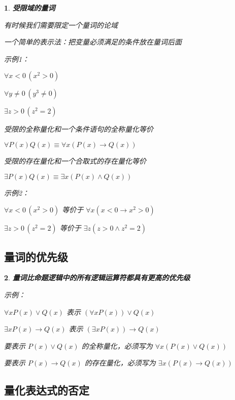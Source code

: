 \documentclass[UTF8]{report}
\theoremstyle{MyLineTheoremStyle} %
\theoremstyle{MyBlockTheoremStyle} %
\theoremstyle{MySubsubsectionStyle} %
\newtheorem{definition}{}
\begin{document}
\begin{definition}
    \textbf{受限域的量词}\par
    有时候我们需要限定一个量词的论域\par
    一个简单的表示法：把变量必须满足的条件放在量词后面\par
    示例1：\par
    $\forall x < 0 \, (x^2 > 0)$\par
    $\forall y \neq 0 \, (y^3 \neq 0)$\par
    $\exists z > 0 \, (z^2 = 2)$\par

    受限的全称量化和一个条件语句的全称量化等价\par
    $\forall P(x) Q(x) \equiv \forall x (P(x) \rightarrow Q(x))$\par
    受限的存在量化和一个合取式的存在量化等价\par
    $\exists P(x) Q(x) \equiv \exists x (P(x) \land Q(x))$\par
    示例2：\par
    $\forall x < 0 \, (x^2 > 0)$ 等价于 $\forall x (x < 0 \rightarrow x^2 > 0)$\par
    $\exists z > 0 \, (z^2 = 2)$ 等价于 $\exists z (z > 0 \land z^2 = 2)$\par
\end{definition}

\subsection{量词的优先级}

\begin{definition}
    \textbf{量词比命题逻辑中的所有逻辑运算符都具有更高的优先级}\par
    示例：\par
    $\forall x P(x) \lor Q(x)$ 表示 $(\forall x P(x)) \lor Q(x)$\par
    $\exists x P(x) \rightarrow Q(x)$ 表示 $(\exists x P(x)) \rightarrow Q(x)$\par
    要表示 $P(x) \lor Q(x)$ 的全称量化，必须写为 $\forall x (P(x) \lor Q(x))$\par
    要表示 $P(x) \rightarrow Q(x)$ 的存在量化，必须写为 $\exists x (P(x) \rightarrow Q(x))$\par
\end{definition}

\subsection{量化表达式的否定}
\end{document}
